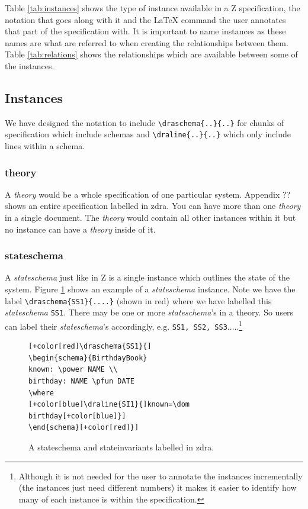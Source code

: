 Table \ref{tab:instances} shows the type of instance available in a Z specification, the notation that goes along with it and the \LaTeX{} command the user annotates that part of the specification with. It is important to name instances as these names are what are referred to when creating the relationships between them. Table \ref{tab:relations} shows the relationships which are available between some of the instances. 

\subsection{Instances}

We have designed the notation to include \verb|\draschema{..}{..}| for chunks of specification which include schemas and \verb|\draline{..}{..}| which only include lines within a schema.

\subsubsection{theory}

A \emph{theory} would be a whole specification of one particular system. Appendix ?? shows an entire specification labelled in \gls{zdra}. You can have more than one \emph{theory} in a single document. The \emph{theory} would contain all other instances within it but no instance can have a \emph{theory} inside of it.

\subsubsection{stateschema}

A \emph{stateschema} just like in Z is a single instance which outlines the state of the system. Figure \ref{fig:exampleofss} shows an example of a \emph{stateschema} instance. Note we have the label \verb|\draschema{SS1}{....}| (shown in red) where we have labelled this \emph{stateschema} \verb|SS1|. There may be one or more \emph{stateschema}'s in a theory. So users can label their \emph{stateschema}'s accordingly, e.g. \verb|SS1, SS2, SS3|.....\footnote{Although it is not needed for the user to annotate the instances incrementally (the instances just need different numbers) it makes it easier to identify how many of each instance is within the specification.}

\begin{figure}[H]
\centering
\begin{footnotesize}
\begin{BVerbatim}[commandchars=+\[\]]
[+color[red]\draschema{SS1}{]
\begin{schema}{BirthdayBook}
known: \power NAME \\ 
birthday: NAME \pfun DATE 
\where 
[+color[blue]\draline{SI1}{]known=\dom birthday[+color[blue]}]
\end{schema}[+color[red]}]
\end{BVerbatim}
\end{footnotesize}
\caption{\label{fig:exampleofss} A stateschema and stateinvariants labelled in \gls{zdra}.}
\end{figure}

